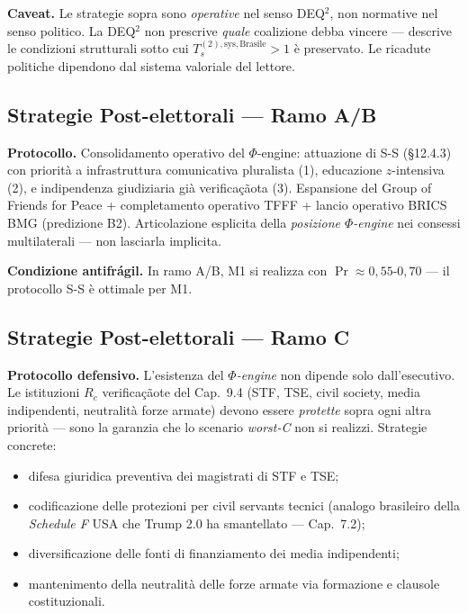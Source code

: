 \Conj{} \textbf{Caveat.} Le strategie sopra sono \emph{operative} nel
senso DEQ$^2$, non normative nel senso politico. La DEQ$^2$ non prescrive
\emph{quale} coalizione debba vincere --- descrive le condizioni
strutturali sotto cui \(T_s^{(2),\text{sys},\text{Brasile}} > 1\) è
preservato. Le ricadute politiche dipendono dal sistema valoriale del
lettore.

\subsection{Strategie Post-elettorali --- Ramo
A/B}\label{strategie-post-elettorali-ramo-ab}

\Hypoth{} \textbf{Protocollo.} Consolidamento operativo del
\(\Phi\)-engine: attuazione di S-S (\S{}12.4.3) con priorità a
infrastruttura comunicativa pluralista (1), educazione \(z\)-intensiva
(2), e indipendenza giudiziaria già verificaçãota (3). Espansione del Group
of Friends for Peace + completamento operativo TFFF + lancio operativo
BRICS BMG (predizione B2). Articolazione esplicita della \emph{posizione
\(\Phi\)-engine} nei consessi multilaterali --- non lasciarla implicita.

\Proved{} \textbf{Condizione antifrágil.} In ramo A/B, M1 si realizza
con \(\Pr \approx 0{,}55\)-\(0{,}70\) --- il protocollo S-S è ottimale
per M1.

\subsection{Strategie Post-elettorali --- Ramo
C}\label{strategie-post-elettorali-ramo-c}

\Hypoth{} \textbf{Protocollo defensivo.} L'esistenza del \emph{$\Phi$-engine}
non dipende solo dall'esecutivo. Le istituzioni \(R_c\) verificaçãote del
Cap.~9.4 (STF, TSE, civil society, media indipendenti, neutralità forze
armate) devono essere \emph{protette} sopra ogni altra priorità --- sono
la garanzia che lo scenario \emph{worst-C} non si realizzi. Strategie
concrete:

\begin{itemize}
\tightlist
\item
  difesa giuridica preventiva dei magistrati di STF e TSE;
\item
  codificazione delle protezioni per civil servants tecnici (analogo
  brasileiro della \emph{Schedule F} USA che Trump 2.0 ha smantellato
  --- Cap.~7.2);
\item
  diversificazione delle fonti di finanziamento dei media indipendenti;
\item
  mantenimento della neutralità delle forze armate via formazione e
  clausole costituzionali.
\end{itemize}

